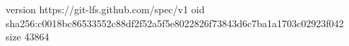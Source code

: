 version https://git-lfs.github.com/spec/v1
oid sha256:c0018bc86533552c88df2f52a5f5e8022826f73843d6c7ba1a1703c02923f042
size 43864
